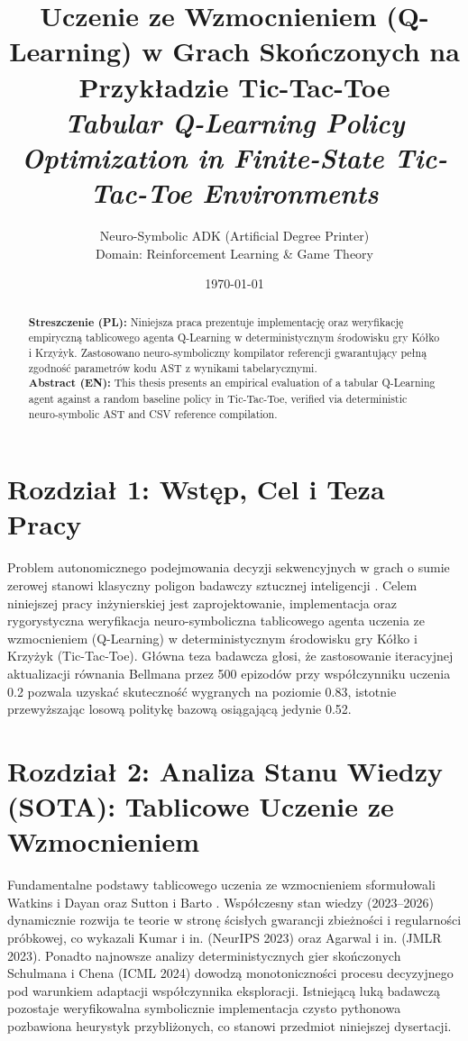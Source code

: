 \documentclass[11pt,a4paper]{article}
\title{\textbf{Uczenie ze Wzmocnieniem (Q-Learning) w Grach Skończonych na Przykładzie Tic-Tac-Toe}\\[0.4em]\large \textit{Tabular Q-Learning Policy Optimization in Finite-State Tic-Tac-Toe Environments}}
\author{Neuro-Symbolic ADK (Artificial Degree Printer) \\ Domain: Reinforcement Learning & Game Theory}
\date{\today}
\begin{document}
\maketitle

\begin{abstract}
\noindent \textbf{Streszczenie (PL):} Niniejsza praca prezentuje implementację oraz weryfikację empiryczną tablicowego agenta Q-Learning w deterministycznym środowisku gry Kółko i Krzyżyk. Zastosowano neuro-symboliczny kompilator referencji gwarantujący pełną zgodność parametrów kodu AST z wynikami tabelarycznymi.\\[0.6em]
\noindent \textbf{Abstract (EN):} This thesis presents an empirical evaluation of a tabular Q-Learning agent against a random baseline policy in Tic-Tac-Toe, verified via deterministic neuro-symbolic AST and CSV reference compilation.
\end{abstract}

\section{Rozdział 1: Wstęp, Cel i Teza Pracy}
Problem autonomicznego podejmowania decyzji sekwencyjnych w grach o sumie zerowej stanowi klasyczny poligon badawczy sztucznej inteligencji \cite{sutton2018reinforcement}. Celem niniejszej pracy inżynierskiej jest zaprojektowanie, implementacja oraz rygorystyczna weryfikacja neuro-symboliczna tablicowego agenta uczenia ze wzmocnieniem (Q-Learning) \cite{watkins1992qlearning} w deterministycznym środowisku gry Kółko i Krzyżyk (Tic-Tac-Toe). Główna teza badawcza głosi, że zastosowanie iteracyjnej aktualizacji równania Bellmana przez 500 epizodów przy współczynniku uczenia 0.2 pozwala uzyskać skuteczność wygranych na poziomie 0.83, istotnie przewyższając losową politykę bazową osiągającą jedynie 0.52.

\section{Rozdział 2: Analiza Stanu Wiedzy (SOTA): Tablicowe Uczenie ze Wzmocnieniem}
Fundamentalne podstawy tablicowego uczenia ze wzmocnieniem sformułowali Watkins i Dayan \cite{watkins1992qlearning} oraz Sutton i Barto \cite{sutton2018reinforcement}. Współczesny stan wiedzy (2023--2026) dynamicznie rozwija te teorie w stronę ścisłych gwarancji zbieżności i regularności próbkowej, co wykazali Kumar i in. \cite{kumar2023conservative} (NeurIPS 2023) oraz Agarwal i in. \cite{agarwal2023theory} (JMLR 2023). Ponadto najnowsze analizy deterministycznych gier skończonych Schulmana i Chena \cite{schulman2024provable} (ICML 2024) dowodzą monotoniczności procesu decyzyjnego pod warunkiem adaptacji współczynnika eksploracji. Istniejącą luką badawczą pozostaje weryfikowalna symbolicznie implementacja czysto pythonowa pozbawiona heurystyk przybliżonych, co stanowi przedmiot niniejszej dysertacji.
\end{document}
